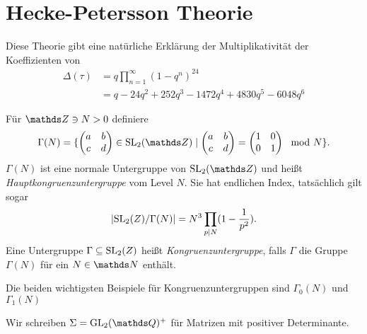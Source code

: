 \chapter{Hecke-Petersson Theorie}
Diese Theorie gibt eine natürliche Erklärung der Multiplikativität
der Koeffizienten von
\begin{align*}
\Delta(\tau)&=q \prod_{n=1}^\infty (1-q^n)^{24}\\
&=q-24q^2+252q^3-1472q^4+4830q^5-6048q^6
\end{align*}


\begin{defi}
Für $\Z \ni N>0$ definiere 
\begin{align*}
\Gamma(N)=\{\begin{pmatrix}
a&b\\
c&d
\end{pmatrix} \in \SL_2(\Z) \mid \begin{pmatrix}
a&b\\
c&d
\end{pmatrix} =\begin{pmatrix}
1&0\\
0&1
\end{pmatrix} \mod N\}.
\end{align*}
$\Gamma(N)$ ist eine normale Untergruppe von $\SL_2(\Z)$ und heißt
\emph{Hauptkongruenzuntergruppe} vom Level $N$.
Sie hat endlichen Index, tatsächlich gilt sogar
\begin{align*}
\left\vert\operatorname{SL}_2(Z)/\Gamma(N)\right\vert =N^3 \prod_{p \mid N} (1-\frac{1}{p^2}).
\end{align*}
Eine Untergruppe $\Gamma \subseteq \operatorname{SL}_2(Z)$ heißt \emph{Kongruenzuntergruppe},
falls $\Gamma$ die Gruppe $\Gamma(N)$ für ein $N \in \N$ enthält.
\end{defi}

\begin{bsp}
Die beiden wichtigsten Beispiele für Kongruenzuntergruppen sind $\Gamma_0(N)$ %
und $\Gamma_1(N)$ %
\end{bsp}

Wir schreiben $\Sigma=\GL_2(\Q)^+$ für Matrizen mit positiver Determinante.

